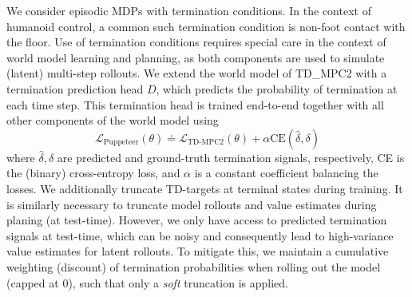 \documentclass[sn-mathphys-num]{sn-jnl}%
\theoremstyle{thmstyleone}	%
\theoremstyle{thmstyletwo}	%
\theoremstyle{thmstylethree}	%
\begin{document}
We consider episodic MDPs with termination conditions.
In the context of humanoid control, a common such termination condition is non-foot contact with the floor.
Use of termination conditions requires special care in the context of world model learning and planning, as both components are used to simulate (latent) multi-step rollouts.
We extend the world model of TD\_MPC2 with a termination prediction head $ D $, which predicts the probability of termination at each time step.
This termination head is trained end-to-end together with all other components of the world model using
\begin{equation}\label{eq:trained_termination}
	\mathcal{L}_\text{Puppeteer}(\theta)
		\doteq
		\mathcal{L}_\text{TD-MPC2} (\theta) + 
		\alpha \text{CE} (\hat{\delta}, \delta)
\end{equation}
%
where $ \hat{\delta}, \delta $ are predicted and ground-truth termination signals, respectively, CE is the (binary) cross-entropy loss, and $ \alpha $ is a constant coefficient balancing the losses.
We additionally truncate TD-targets at terminal states during training.
It is similarly necessary to truncate model rollouts and value estimates during planing (at test-time).
However, we only have access to predicted termination signals at test-time, which can be noisy and consequently lead to high-variance value estimates for latent rollouts.
To mitigate this, we maintain a cumulative weighting (discount) of termination probabilities when rolling out the model (capped at 0), such that only a \textit{soft} truncation is applied.
\end{document}
